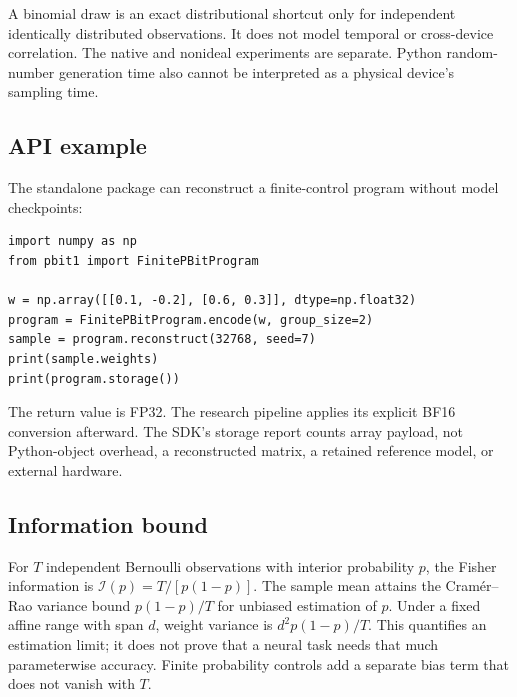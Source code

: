 \documentclass[11pt]{article}
\begin{document}
A binomial draw is an exact distributional shortcut only for independent identically distributed observations. It does not model temporal or cross-device correlation. The native and nonideal experiments are separate. Python random-number generation time also cannot be interpreted as a physical device's sampling time.

\subsection{API example}
The standalone package can reconstruct a finite-control program without model checkpoints:
\begin{verbatim}
import numpy as np
from pbit1 import FinitePBitProgram

w = np.array([[0.1, -0.2], [0.6, 0.3]], dtype=np.float32)
program = FinitePBitProgram.encode(w, group_size=2)
sample = program.reconstruct(32768, seed=7)
print(sample.weights)
print(program.storage())
\end{verbatim}
The return value is FP32. The research pipeline applies its explicit BF16 conversion afterward. The SDK's storage report counts array payload, not Python-object overhead, a reconstructed matrix, a retained reference model, or external hardware.

\subsection{Information bound}
For $T$ independent Bernoulli observations with interior probability $p$, the Fisher information is $\mathcal I(p)=T/[p(1-p)]$. The sample mean attains the Cram\'er--Rao variance bound $p(1-p)/T$ for unbiased estimation of $p$. Under a fixed affine range with span $d$, weight variance is $d^2p(1-p)/T$. This quantifies an estimation limit; it does not prove that a neural task needs that much parameterwise accuracy. Finite probability controls add a separate bias term that does not vanish with $T$.
\end{document}
